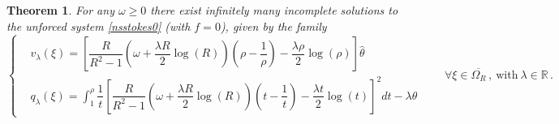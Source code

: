 \documentclass[a4paper,11pt]{article}
\newtheorem{theorem}{Theorem}[section]
\numberwithin{equation}{section}
\numberwithin{figure}{section}
\begin{document}
\begin{theorem} \label{nonuniquetheo}
For any $\omega \geq 0$ there exist infinitely many incomplete solutions to the unforced system \eqref{nsstokes0} (with $f=0$),
given by the family
$$
\left\{
\begin{aligned}
	& v_{\lambda}(\xi) = \left[ \dfrac{R}{R^2 - 1} \left( \omega + \dfrac{\lambda R}{2} \log(R) \right)  \left( \rho - \dfrac{1}{\rho} \right) -
\dfrac{\lambda \rho}{2} \log(\rho) \right] \widehat{\theta} \\[6pt]
	& q_{\lambda}(\xi) = \int_{1}^{\rho} \dfrac{1}{t} \left[ \dfrac{R}{R^2 - 1} \left( \omega + \dfrac{\lambda R}{2} \log(R) \right)  \left( t -
\dfrac{1}{t} \right) - \dfrac{\lambda t}{2} \log(t) \right]^{2} dt - \lambda \theta
\end{aligned}
\right. \qquad \forall \xi \in \overline{\Omega_{R}} \, , \ \text{with} \ \lambda \in \mathbb{R} \, .
$$
\end{theorem}
\noindent
\end{document}
